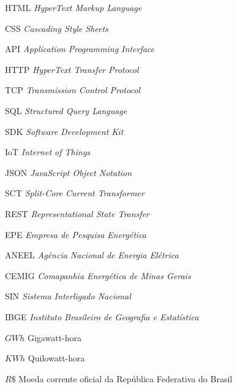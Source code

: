 \documentclass[
	12pt,				%
	oneside,
	a4paper,			%
	chapter=TITLE,
	english,			%
	brazil,				%
	]{abntex2}
\begin{document}


\listoffigures*
\cleardoublepage

\listoftables*
\cleardoublepage

\begin{siglas}
\item[HTML]   \textit{HyperText Markup Language}
\item[CSS]	  \textit{Cascading Style Sheets}
\item[API]    \textit{Application Programming Interface}
\item[HTTP]   \textit{HyperText Transfer Protocol}
\item[TCP]    \textit{Transmission Control Protocol}
\item[SQL]    \textit{Structured Query Language} 	
\item[SDK]    \textit{Software Development Kit}
\item[IoT]    \textit{Internet of Things}
\item[JSON]   \textit{JavaScript Object Notation}
\item[SCT]    \textit{Split-Core Current Transformer}
\item[REST]   \textit{Representational State Transfer}
\item[EPE]    \textit{Empresa de Pesquisa Energética}
\item[ANEEL]  \textit{Agência Nacional de Energia Elétrica}
\item[CEMIG]  \textit{Comapanhia Energética de Minas Gerais}
\item[SIN]    \textit{Sistema Interligado Nacional}
\item[IBGE]    \textit{Instituto Brasileiro de Geografia e Estatística}
\end{siglas}

\begin{simbolos}
  \item[$ GWh $] Gigawatt-hora
  \item[$ KWh $] Quilowatt-hora
  \item[$ R\$ $] Moeda corrente oficial da República Federativa do Brasil
\end{simbolos}

\tableofcontents*
\cleardoublepage
\end{document}
